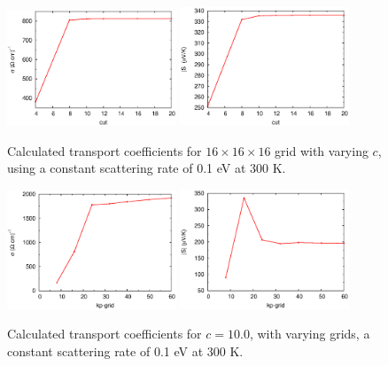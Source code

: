 \documentclass[
amsmath,amssymb,
aps,
prb,
]{revtex4}
\begin{document}
\begin{figure}[!ht]
\includegraphics[width=0.45\textwidth]{sig_vs_cut.eps}
\includegraphics[width=0.45\textwidth]{Se_vs_cut.eps}
\caption{\label{fig:vs_cut} Calculated transport coefficients for $16 \times 16 \times 16$ grid with varying $c$,
using a constant scattering rate of 0.1 eV at 300 K.}
\end{figure}
%

%
\begin{figure}[!ht]
\includegraphics[width=0.45\textwidth]{sig_vs_kp.eps}
\includegraphics[width=0.45\textwidth]{Se_vs_kp.eps}
\caption{\label{fig:vs_kp} Calculated transport coefficients for $c=10.0$, with varying grids,
a constant scattering rate of 0.1 eV at 300 K.}
\end{figure}
%



%
% 
\end{document}
